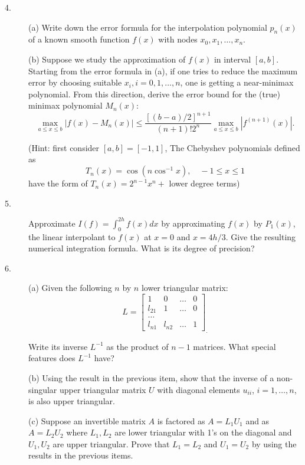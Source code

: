 \documentclass{article}
\begin{document}
\begin{description}
\item[4.] (a)
Write down the error formula for the interpolation polynomial $p_n(x)$ of
a known smooth function $f(x)$ with nodes $x_0, x_1, \dots, x_n$.

\item[\quad] (b)
Suppose we study the approximation of $f(x)$ in interval $[a,b]$. Starting
from the error formula in (a), if one tries to reduce the maximum error by
choosing suitable $x_i, i=0,1, \dots, n$, one is getting a near-minimax
polynomial. From this direction, derive the error bound
for the (true) minimax polynomial $M_n(x)$:
$$\max_{a \leq x \leq b} |f(x) - M_n(x)| \leq
  \frac{[(b-a) / 2]^{n+1}}{(n+1)!2^n} \max_{a \leq x \leq b}
  |f^{(n+1)} (x)|.$$

(Hint: first consider $[a,b]=[-1,1]$, The Chebyshev polynomials defined as
$$T_n(x) = \cos(n \cos^{-1} x), \quad -1 \leq x \leq 1$$
have the form of $T_n(x) = 2^{n-1} x^n +$ lower degree terms)

\item[5.]
Approximate $I(f) = \int^{2h}_0 f(x) dx$ by approximating $f(x)$ by
$P_1(x)$, the linear interpolant to $f(x)$ at $x=0$ and $x= 4h / 3$. Give
the resulting numerical integration formula. What is its degree of precision?

\item[6.] (a)
Given the following $n$ by $n$ lower triangular matrix:
$$L= \left[ \begin{array}{cccc}
                1&0&\dots&0 \\
                l_{21}&1&\dots&0 \\
                \dots \\
                l_{n1}&l_{n2}&\dots&1
                \end{array}
                \right]_.$$

Write its inverse $L^{-1}$ as the product of $n-1$ matrices. What special
features does $L^{-1}$ have?

\item[\quad] (b)
Using the result in the previous item, show that the inverse of a non-singular
upper triangular matrix $U$ with diagonal elements $u_{ii}$, $i=1,\dots, n$,
is also upper triangular.

\item[\quad] (c)
Suppose an invertible matrix $A$ is factored as $A=L_1U_1$ and as
$A=L_2U_2$ where $L_1,L_2$ are lower triangular with 1's on the diagonal
and $U_1,U_2$ are upper triangular. Prove that $L_1=L_2$ and $U_1=U_2$ by
using the results in the previous items.


\end{description}
\end{document}
